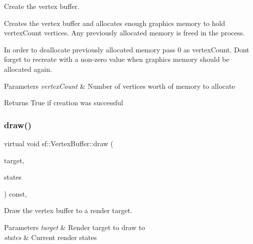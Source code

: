 Create the vertex buffer. 

Creates the vertex buffer and allocates enough graphics memory to hold {\ttfamily vertex\+Count} vertices. Any previously allocated memory is freed in the process.

In order to deallocate previously allocated memory pass 0 as {\ttfamily vertex\+Count}. Don\textquotesingle{}t forget to recreate with a non-\/zero value when graphics memory should be allocated again.


\begin{DoxyParams}{Parameters}
{\em vertex\+Count} & Number of vertices worth of memory to allocate\\
\hline
\end{DoxyParams}
\begin{DoxyReturn}{Returns}
True if creation was successful \begin{DoxyVerb}\end{DoxyVerb}
 
\end{DoxyReturn}
\mbox{\label{classsf_1_1_vertex_buffer_a3591a7fd52f502033b40755af71edc17}} 
\subsubsection{\texorpdfstring{draw()}{draw()}}
{\footnotesize\ttfamily virtual void sf\+::\+Vertex\+Buffer\+::draw (\begin{DoxyParamCaption}\item[{\mbox{\hyperlink{classsf_1_1_render_target}{Render\+Target}} \&}]{target,  }\item[{\mbox{\hyperlink{classsf_1_1_render_states}{Render\+States}}}]{states }\end{DoxyParamCaption}) const\hspace{0.3cm}{\ttfamily [private]}, {\ttfamily [virtual]}}



Draw the vertex buffer to a render target. 


\begin{DoxyParams}{Parameters}
{\em target} & Render target to draw to \\
\hline
{\em states} & Current render states \begin{DoxyVerb}\end{DoxyVerb}
 \\
\hline
\end{DoxyParams}


